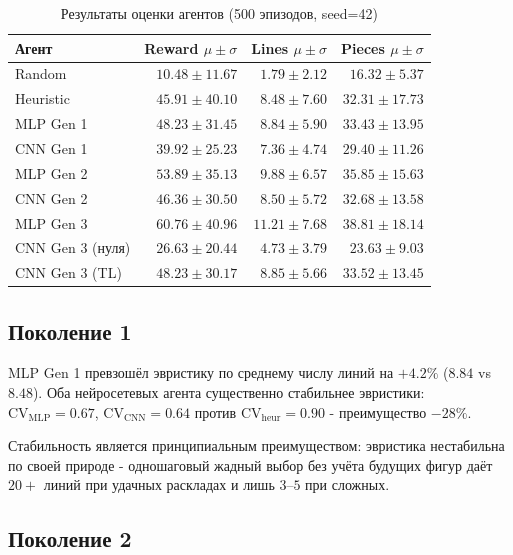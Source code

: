 \documentclass[12pt, a4paper]{article}
\begin{document}
\begin{table}[H]
  \centering
  \caption{Результаты оценки агентов (500 эпизодов, seed=42)}
  \label{tab:results_all}
  \small
  \begin{tabular}{lrrr}
    \toprule
    \textbf{Агент} & \textbf{Reward} $\mu\pm\sigma$ & \textbf{Lines} $\mu\pm\sigma$ & \textbf{Pieces} $\mu\pm\sigma$ \\
    \midrule
    Random            & $10.48 \pm 11.67$ & $1.79 \pm 2.12$  & $16.32 \pm 5.37$  \\
    Heuristic         & $45.91 \pm 40.10$ & $8.48 \pm 7.60$  & $32.31 \pm 17.73$ \\
    \midrule
    MLP Gen 1         & $48.23 \pm 31.45$ & $8.84 \pm 5.90$  & $33.43 \pm 13.95$ \\
    CNN Gen 1         & $39.92 \pm 25.23$ & $7.36 \pm 4.74$  & $29.40 \pm 11.26$ \\
    \midrule
    MLP Gen 2         & $53.89 \pm 35.13$ & $9.88 \pm 6.57$  & $35.85 \pm 15.63$ \\
    CNN Gen 2         & $46.36 \pm 30.50$ & $8.50 \pm 5.72$  & $32.68 \pm 13.58$ \\
    \midrule
    MLP Gen 3         & $\mathbf{60.76 \pm 40.96}$ & $\mathbf{11.21 \pm 7.68}$ & $\mathbf{38.81 \pm 18.14}$ \\
    CNN Gen 3 (нуля)  & $26.63 \pm 20.44$ & $4.73 \pm 3.79$  & $23.63 \pm 9.03$  \\
    CNN Gen 3 (TL)    & $48.23 \pm 30.17$ & $8.85 \pm 5.66$  & $33.52 \pm 13.45$ \\
    \bottomrule
  \end{tabular}
\end{table}

\subsection{Поколение 1}

MLP Gen 1 превзошёл эвристику по среднему числу линий на $+4.2\%$ ($8.84$ vs $8.48$). Оба нейросетевых агента существенно стабильнее эвристики: $\mathrm{CV}_\text{MLP} = 0.67$, $\mathrm{CV}_\text{CNN} = 0.64$ против $\mathrm{CV}_\text{heur} = 0.90$ - преимущество $-28\%$.

Стабильность является принципиальным преимуществом: эвристика нестабильна по своей природе - одношаговый жадный выбор без учёта будущих фигур даёт $20+$ линий при удачных раскладах и лишь $3$--$5$ при сложных.

\subsection{Поколение 2}
\end{document}
